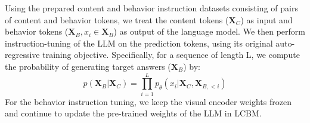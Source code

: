 Using the prepared content and behavior instruction datasets consisting of pairs of content and behavior tokens, we treat the content tokens ($\mathbf{X}_C$) as input and behavior tokens ($\mathbf{X}_B, x_i\in\mathbf{X}_B$) as output of the language model. We then perform instruction-tuning of the LLM on the prediction tokens, using its original auto-regressive training objective. Specifically, for a sequence of length L, we compute the probability of generating target answers ($\mathbf{X}_B$) by:
\begin{equation}
    p(\mathbf{X}_B | \mathbf{X}_C) = \prod_{i=1}^{L} p_{\theta}(x_i | \mathbf{X}_C, \mathbf{X}_{B, <i})
\end{equation}
For the behavior instruction tuning, we keep the visual encoder weights frozen and continue to update the pre-trained weights of the LLM in LCBM. 






